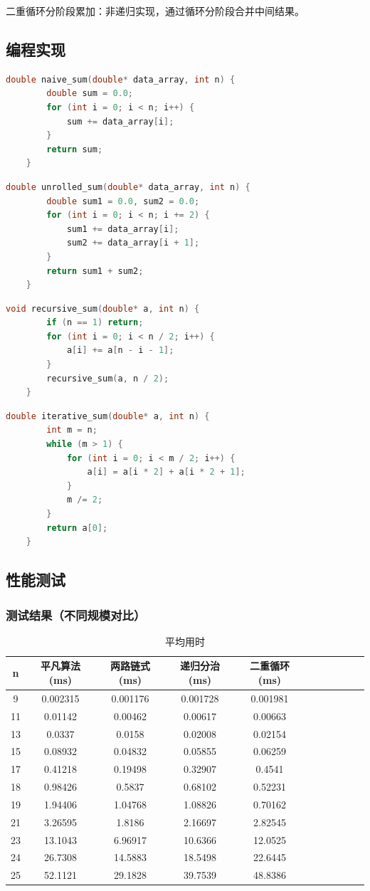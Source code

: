 \documentclass[a4paper]{article}
\begin{document}
二重循环分阶段累加：非递归实现，通过循环分阶段合并中间结果。
\subsection{编程实现}
\begin{lstlisting}[title=平凡算法：链式累加,frame=trbl,language={C++}]
	double naive_sum(double* data_array, int n) {
		double sum = 0.0;
		for (int i = 0; i < n; i++) {
			sum += data_array[i];
		}
		return sum;
	}
\end{lstlisting}
\begin{lstlisting}[title=两路链式累加,frame=trbl,language={C++}]
	double unrolled_sum(double* data_array, int n) {
		double sum1 = 0.0, sum2 = 0.0;
		for (int i = 0; i < n; i += 2) {
			sum1 += data_array[i];
			sum2 += data_array[i + 1];
		}
		return sum1 + sum2;
	}
\end{lstlisting}
\begin{lstlisting}[title=递归分治算法,frame=trbl,language={C++}]
	void recursive_sum(double* a, int n) {
		if (n == 1) return;
		for (int i = 0; i < n / 2; i++) {
			a[i] += a[n - i - 1];
		}
		recursive_sum(a, n / 2);
	}
\end{lstlisting}
\begin{lstlisting}[title=二重循环分阶段累加,frame=trbl,language={C++}]
	double iterative_sum(double* a, int n) {
		int m = n;
		while (m > 1) {
			for (int i = 0; i < m / 2; i++) {
				a[i] = a[i * 2] + a[i * 2 + 1];
			}
			m /= 2;
		}
		return a[0];
	}
\end{lstlisting}
\subsection{性能测试}
\subsubsection{测试结果（不同规模对比）}
\begin{table}[!htbp]
	\centering
	\begin{tabular}{ccccccccccc}
		\toprule  
		n& 平凡算法(ms)& 两路链式(ms)& 递归分治(ms)& 二重循环(ms)\\
		\midrule
		9& 0.002315& 0.001176& 0.001728& 0.001981\\
		11& 0.01142& 0.00462& 0.00617& 0.00663\\
		13& 0.0337& 0.0158& 0.02008& 0.02154\\
		15& 0.08932& 0.04832& 0.05855& 0.06259\\
		17& 0.41218& 0.19498& 0.32907& 0.4541\\
		18& 0.98426& 0.5837& 0.68102& 0.52231\\
		19& 1.94406& 1.04768& 1.08826& 0.70162\\
		21& 3.26595& 1.8186& 2.16697& 2.82545\\
		23& 13.1043& 6.96917& 10.6366& 12.0525\\
		24& 26.7308& 14.5883& 18.5498& 22.6445\\
		25& 52.1121& 29.1828& 39.7539& 48.8386\\
		\bottomrule
	\end{tabular}
	\caption{平均用时}
	\label{table:t4}
\end{table}
\end{document}
